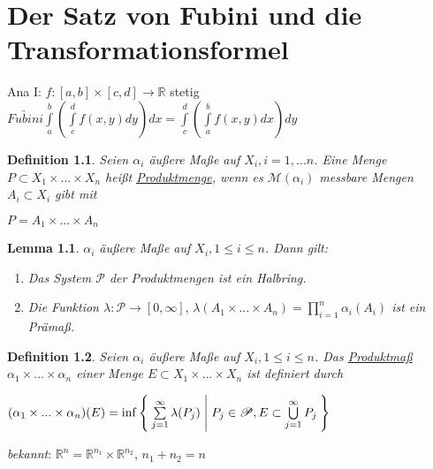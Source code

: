 \documentclass[11pt]{memoir}
\theoremstyle{changebreak}
\newtheorem{Definition}{Definition}[chapter]
\newtheorem{Lemma}{Lemma}[chapter]
\begin{document}




\newpage
\chapter{Der Satz von Fubini und die Transformationsformel}
Ana I: $f: [a, b] \times [c, d] \rightarrow \mathbb R$ stetig \\
$\underrightarrow{Fubini} \int\limits_a^b \left( \int\limits_c^d f(x, y) dy\right) dx = \int\limits_c^d \left( \int\limits_a^b f(x, y) dx \right) dy$

\begin{Definition}
Seien $\alpha_i$ äußere Maße auf $X_i, i = 1, ... n$. Eine Menge $P \subset X_1 \times ... \times X_n$ heißt \underline{Produktmenge}, wenn es $\mathscr M(\alpha_i)$ messbare Mengen $A_i \subset X_i$ gibt mit
\begin{center}
	$P = A_1 \times ... \times A_n$
\end{center}
\end{Definition}

\begin{Lemma}
$\alpha_i$ äußere Maße auf $X_i, 1 \leq i \leq n$. Dann gilt:
\begin{enumerate}
	\item Das System $\mathscr P$ der Produktmengen ist ein Halbring.
	\item Die Funktion $\lambda: \mathscr P \rightarrow [0, \infty], \, \lambda(A_1 \times ... \times A_n) = \prod\limits_{i=1}^n \alpha_i(A_i)$ ist ein Prämaß.
\end{enumerate}
\end{Lemma}

\begin{Definition}
Seien $\alpha_i$ äußere Maße auf $X_i, 1 \leq i \leq n$. Das \underline{Produktmaß} $\alpha_1 \times ... \times \alpha_n$ einer Menge $E \subset X_1 \times ... \times X_n$ ist definiert durch
\begin{center}
	$(\alpha_1 \times ... \times \alpha_n)(E) = \inf\Set{ \sum\limits_{j=1}^\infty \lambda(P_j) | P_j \in \mathscr P, E \subset \bigcup\limits_{j=1}^\infty P_j }$

\end{center}
\end{Definition}

\emph{bekannt}:
$\mathbb R^n = \mathbb R^{n_1} \times \mathbb R^{n_2}$, $n_1 + n_2 = n$
\end{document}
